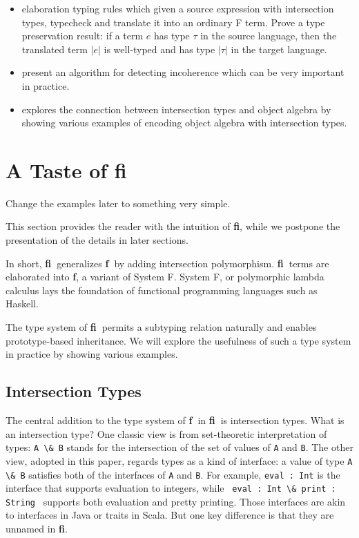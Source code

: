 \documentclass[preprint]{sigplanconf}
\newcommand{\systemf}{{\bf f~}}
\newcommand{\systemF}{{\bf f}}
\newcommand{\systemfi}{{\bf fi~}}
\newcommand{\systemFI}{{\bf fi}}
\begin{document}
\begin{itemize}

\item{elaboration typing rules which given a source expression with intersection
    types, typecheck and translate it into an ordinary F term. Prove a type
    preservation result: if a term $e$ has type $\tau$ in the source language,
    then the translated term $|e|$ is well-typed and has type $|\tau|$ in the
    target language.}

\item{present an algorithm for detecting incoherence which can be very important
    in practice.}

\item{explores the connection between intersection types and object algebra by
    showing various examples of encoding object algebra with intersection
    types.}

\end{itemize}
\section{A Taste of fi}

\begin{footnote}
  Change the examples later to something very simple.
\end{footnote}

This section provides the reader with the intuition of \systemFI, while we postpone
the presentation of the details in later sections.

In short, \systemfi generalizes \systemf by adding intersection polymorphism. \systemfi terms
are elaborated into \systemF, a variant of System F. System F, or polymorphic
lambda calculus lays the foundation of functional programming languages such as
Haskell.

The type system of \systemfi permits a subtyping relation naturally and enables
prototype-based inheritance. We will explore the usefulness of such a type
system in practice by showing various examples.

\subsection{Intersection Types}

The central addition to the type system of \systemf in \systemfi is intersection types. What
is an intersection type? One classic view is from set-theoretic interpretation
of types: \lstinline{A \& B} stands for the intersection of the set of values of
\lstinline{A} and \lstinline{B}. The other view, adopted in this paper, regards
types as a kind of interface: a value of type \lstinline{A \& B} satisfies both
of the interfaces of \lstinline{A} and \lstinline{B}. For example,
\lstinline{eval : Int} is the interface that supports evaluation to integers,
while \lstinline{ eval : Int \& print : String } supports both evaluation and
pretty printing. Those interfaces are akin to interfaces in Java or traits in
Scala. But one key difference is that they are unnamed in \systemFI.
\end{document}
